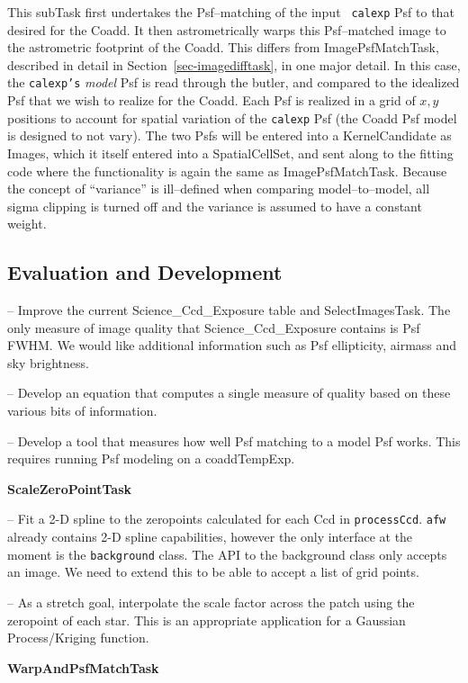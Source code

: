\documentclass[12pt]{article}
\begin{document}
This subTask first undertakes the Psf--matching of the input {\tt
  calexp} Psf to that desired for the Coadd.  It then astrometrically
warps this Psf--matched image to the astrometric footprint of the
Coadd.  This differs from ImagePsfMatchTask, described in detail in
Section~\ref{sec-imagedifftask}, in one major detail.  In this case,
the {\tt calexp's} {\it model} Psf is read through the butler, and
compared to the idealized Psf that we wish to realize for the Coadd.
Each Psf is realized in a grid of $x,y$ positions to account for
spatial variation of the {\tt calexp} Psf (the Coadd Psf model is
designed to not vary).  The two Psfs will be entered into a
KernelCandidate as Images, which it itself entered into a
SpatialCellSet, and sent along to the fitting code where the
functionality is again the same as ImagePsfMatchTask.  Because the
concept of ``variance'' is ill--defined when comparing
model--to--model, all sigma clipping is turned off and the variance is
assumed to have a constant weight.


\subsection{Evaluation and Development}

-- Improve the current Science\_Ccd\_Exposure table and SelectImagesTask.
The only measure of image quality that Science\_Ccd\_Exposure contains is Psf FWHM.
We would like additional information such as Psf ellipticity, airmass and sky brightness.

-- Develop an equation that computes a single measure of quality
based on these various bits of information.

-- Develop a tool that measures how well Psf matching to a model Psf
works. This requires running Psf modeling on a coaddTempExp.


{\bf ScaleZeroPointTask}

--  Fit a 2-D spline to the zeropoints calculated for each Ccd in {\tt processCcd}.   {\tt afw} already contains 2-D spline capabilities, however the only interface at the moment is the {\tt background} class. The API to the background class only accepts an image. We need to extend this  to be able to accept a list of grid points.   

-- As a stretch goal, interpolate the scale factor across the patch using the zeropoint of each star. This is an appropriate application for a Gaussian Process/Kriging function. 

{\bf WarpAndPsfMatchTask}
\end{document}
